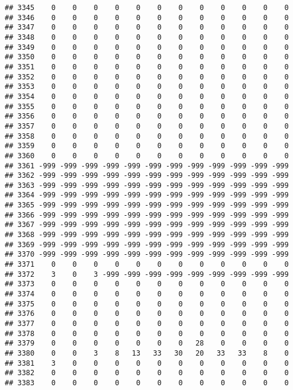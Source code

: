 \documentclass[]{article}
\begin{document}
\begin{verbatim}
## 3345    0    0    0    0    0    0    0    0    0    0    0    0
## 3346    0    0    0    0    0    0    0    0    0    0    0    0
## 3347    0    0    0    0    0    0    0    0    0    0    0    0
## 3348    0    0    0    0    0    0    0    0    0    0    0    0
## 3349    0    0    0    0    0    0    0    0    0    0    0    0
## 3350    0    0    0    0    0    0    0    0    0    0    0    0
## 3351    0    0    0    0    0    0    0    0    0    0    0    0
## 3352    0    0    0    0    0    0    0    0    0    0    0    0
## 3353    0    0    0    0    0    0    0    0    0    0    0    0
## 3354    0    0    0    0    0    0    0    0    0    0    0    0
## 3355    0    0    0    0    0    0    0    0    0    0    0    0
## 3356    0    0    0    0    0    0    0    0    0    0    0    0
## 3357    0    0    0    0    0    0    0    0    0    0    0    0
## 3358    0    0    0    0    0    0    0    0    0    0    0    0
## 3359    0    0    0    0    0    0    0    0    0    0    0    0
## 3360    0    0    0    0    0    0    0    0    0    0    0    0
## 3361 -999 -999 -999 -999 -999 -999 -999 -999 -999 -999 -999 -999
## 3362 -999 -999 -999 -999 -999 -999 -999 -999 -999 -999 -999 -999
## 3363 -999 -999 -999 -999 -999 -999 -999 -999 -999 -999 -999 -999
## 3364 -999 -999 -999 -999 -999 -999 -999 -999 -999 -999 -999 -999
## 3365 -999 -999 -999 -999 -999 -999 -999 -999 -999 -999 -999 -999
## 3366 -999 -999 -999 -999 -999 -999 -999 -999 -999 -999 -999 -999
## 3367 -999 -999 -999 -999 -999 -999 -999 -999 -999 -999 -999 -999
## 3368 -999 -999 -999 -999 -999 -999 -999 -999 -999 -999 -999 -999
## 3369 -999 -999 -999 -999 -999 -999 -999 -999 -999 -999 -999 -999
## 3370 -999 -999 -999 -999 -999 -999 -999 -999 -999 -999 -999 -999
## 3371    0    0    0    0    0    0    0    0    0    0    0    0
## 3372    3    0    3 -999 -999 -999 -999 -999 -999 -999 -999 -999
## 3373    0    0    0    0    0    0    0    0    0    0    0    0
## 3374    0    0    0    0    0    0    0    0    0    0    0    0
## 3375    0    0    0    0    0    0    0    0    0    0    0    0
## 3376    0    0    0    0    0    0    0    0    0    0    0    0
## 3377    0    0    0    0    0    0    0    0    0    0    0    0
## 3378    0    0    0    0    0    0    0    0    0    0    0    0
## 3379    0    0    0    0    0    0    0   28    0    0    0    0
## 3380    0    0    3    8   13   33   30   20   33   33    8    0
## 3381    3    0    0    0    0    0    0    0    0    0    0    0
## 3382    0    0    0    0    0    0    0    0    0    0    0    0
## 3383    0    0    0    0    0    0    0    0    0    0    0    0

\end{verbatim}
\end{document}
